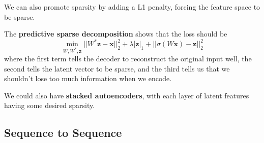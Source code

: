\documentclass{article}
\begin{document}
\begin{enumerate}
      We can also promote sparsity by adding a L1 penalty, forcing the feature space to be sparse. 
    \end{enumerate}

    The \textbf{predictive sparse decomposition} shows that the loss should be 
    \[\min_{W, W^\ast, \mathbf{z}} ||W^\ast \mathbf{z} - \mathbf{x}||^2_2 + \lambda | \mathbf{z}|_1 + ||\sigma(W \mathbf{x}) - \mathbf{z}||^2_2\]
    where the first term tells the decoder to reconstruct the original input well, the second tells the latent vector to be sparse, and the third tells us that we shouldn't lose too much information when we encode. 

    We could also have \textbf{stacked autoencoders}, with each layer of latent features having some desired sparsity. 

  \subsection{Sequence to Sequence}
\end{document}
